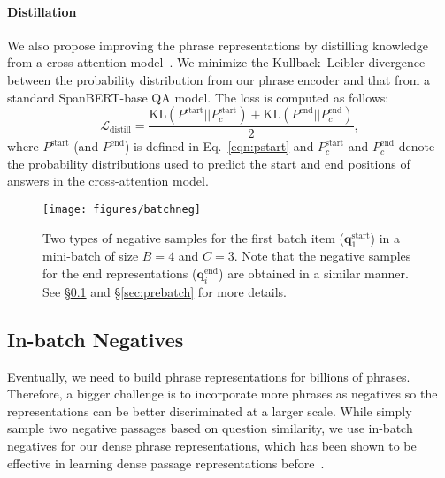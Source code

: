 \documentclass[11pt,a4paper]{article}
\begin{document}
\paragraph{Distillation} We also propose improving the phrase representations by distilling knowledge from a cross-attention model~\citep{hinton2015distilling}.
We minimize the Kullback–Leibler divergence between the probability distribution from our phrase encoder and that from a standard SpanBERT-base QA model. The loss is computed as follows:
\begin{equation}\label{eqn:distill}
    \mathcal{L}_\text{distill} = \frac{ \text{KL}(P^\text{start} || P^\text{start}_{c}) + \text{KL}(P^\text{end} || P^\text{end}_{c})}{2},
\end{equation}
where $P^\text{start}$ (and $P^\text{end}$) is defined in Eq.~\eqref{eqn:pstart} and $P^\text{start}_c$ and $P^\text{end}_c$ denote the probability distributions used to predict the start and end positions of answers in the cross-attention model.






\begin{figure}[t]
\begin{center}
\texttt{[image: figures/batchneg]}
\end{center}\vspace{-0.2cm}
\caption{Two types of negative samples for the first batch item ($\mathbf{q}_1^\text{start}$) in a mini-batch of size $B=4$ and $C=3$.  Note that the negative samples for the end representations ($\mathbf{q}_i^\text{end}$) are obtained in a similar manner. See \S\ref{sec:inbatch} and \S\ref{sec:prebatch} for more details.
}\vspace{-0.3cm}\label{fig:batchneg}
\end{figure}

 
\subsection{In-batch Negatives}\label{sec:inbatch}
Eventually, we need to build phrase representations for billions of phrases. Therefore, a bigger challenge is to incorporate more phrases as negatives so the representations can be better discriminated at a larger scale.
While \citet{seo2019real} simply sample two negative passages based on question similarity, we use in-batch negatives for our dense phrase representations, which has been shown to be effective in learning dense passage representations before~\cite{karpukhin2020dense}.
\end{document}

